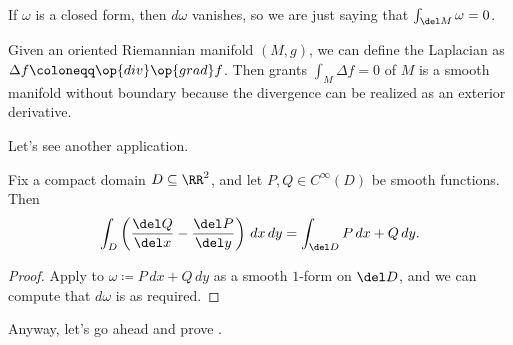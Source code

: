 \documentclass[../notes.tex]{subfiles}
\begin{document}
\begin{example}
	If $\omega$ is a closed form, then $d\omega$ vanishes, so we are just saying that $\int_{\del M}\omega=0$.
\end{example}
\begin{example}
	Given an oriented Riemannian manifold $(M,g)$, we can define the Laplacian as $\Delta f\coloneqq\op{div}\op{grad}f$. Then  grants $\int_M\Delta f=0$ of $M$ is a smooth manifold without boundary because the divergence can be realized as an exterior derivative.
\end{example}
Let's see another application.
\begin{theorem}[Green]
	Fix a compact domain $D\subseteq\RR^2$, and let $P,Q\in C^\infty(D)$ be smooth functions. Then
	\[\int_D\left(\frac{\del Q}{\del x}-\frac{\del P}{\del y}\right)\,dx\,dy=\int_{\del D}P\,dx+Q\,dy.\]
\end{theorem}
\begin{proof}
	Apply  to $\omega\coloneqq P\,dx+Q\,dy$ as a smooth $1$-form on $\del D$, and we can compute that $d\omega$ is as required.
\end{proof}
Anyway, let's go ahead and prove .
\end{document}

